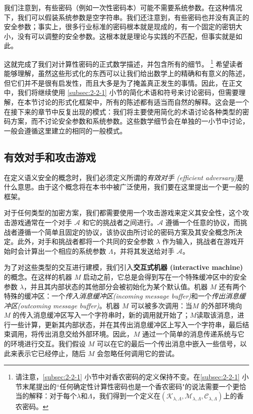 我们注意到，有些密码（例如一次性密码本）可能不需要系统参数。在这种情况下，我们可以假装系统参数是空字符串。我们还注意到，有些密码也并没有真正的安全参数；事实上，很多行业标准的密码根本就是现成的，有一个固定的密钥大小，没有可以调整的安全参数。这根本就是理论与实践的不匹配，但事实就是如此。

这就完成了我们对计算性密码的正式数学描述，并包含所有的细节。
\footnote{
请注意，\ref{subsec:2-2-1} 小节中对香农密码的定义保持不变。在\ref{subsec:2-2-1} 小节末尾提出的``任何确定性计算性密码也是一个香农密码"的说法需要一个更恰当的解释：对于每个$\lambda$和$\Lambda$，我们得到一个定义在$(\mathcal{K}_{\lambda,\Lambda},\mathcal{M}_{\lambda,\Lambda},\mathcal{C}_{\lambda,\Lambda})$上的香农密码。
}
希望读者能够理解，虽然这些形式化的东西可以让我们给出数学上的精确和有意义的陈述，但它们并不是很有启发性，而且大多是为了掩盖真正发生的事情。因此，在正文中，我们将继续使用 \ref{subsec:2-2-1} 小节的简化术语和符号来讨论密码，但需要理解，在本节讨论的形式化框架中，所有的陈述都有适当而自然的解释。这会是一个在接下来的章节中反复出现的模式：我们将主要使用简化的术语讨论各种类型的密码方案，而不讨论安全参数和系统参数。这些数学细节会在单独的一小节中讨论，一般会遵循这里建立的相同的一般模式。

\subsection{有效对手和攻击游戏}

在定义语义安全的概念时，我们必须定义所谓的\emph{有效对手 (efficient adversary)}是什么意思。由于这个概念将在本书中被广泛使用，我们要在这里提出一个更一般的框架。

对于任何类型的加密方案，我们都需要使用一个攻击游戏来定义其安全性，这个攻击游戏通常在一个对手 $\mathcal{A}$ 和它的挑战者之间进行。$\mathcal{A}$ 遵循一个任意的协议，而挑战者遵循一个简单且固定的协议，该协议由所讨论的密码方案及其安全概念所决定。此外，对手和挑战者都将一个共同的安全参数 $\lambda$ 作为输入，挑战者在游戏开始时会计算出一个相应的系统参数 $\Lambda$，并将其发送给对手 $\mathcal{A}$。

为了对这些类型的交互进行建模，我们引入\textbf{交互式机器 (interactive machine)}的概念。在这样的机器 $M$ 启动之前，它总是会得到写在一个特殊缓冲区中的安全参数 $\lambda$，并且其内部状态的其他部分会被初始化为某个默认值。机器 $M$ 还有两个特殊的缓冲区：一个\emph{传入消息缓冲区(incoming message buffer)}和一个\emph{传出消息缓冲区(outcoming message buffer)}。机器 $M$ 可以被多次调用：当$M$ 的外部环境向 $M$ 的传入消息缓冲区写入一个字符串时，新的调用就开始了；$M$读取该消息，进行一些计算，更新其内部状态，并在其传出消息缓冲区上写入一个字符串，最后结束调用，将传出消息交给外部环境。因此，$M$ 通过一个简单的消息传递系统与它的环境进行交互。我们假设 $M$ 可以在它的最后一个传出消息中嵌入一些信号，以此来表示它已经停止，随后 $M$ 会忽略任何调用它的尝试。


